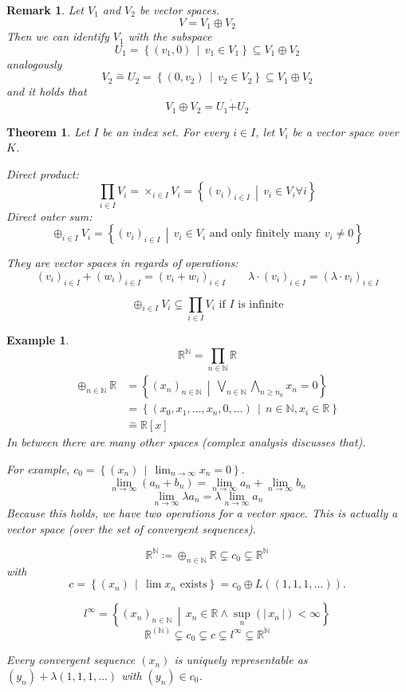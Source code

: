 \documentclass[a4paper,landscape,twocolumn]{article}
\newcommand\abs[1]{|\,#1\,|}
\newcommand\setdef[2]{\left\{#1\,\middle|\,#2\right\}}
\newtheorem{theorem}{Theorem}
\newtheorem{ex}{Example}
\newtheorem{rem}{Remark}
\begin{document}
\begin{rem}
  Let $V_1$ and $V_2$ be vector spaces.
  \[ V = V_1 \oplus V_2 \]
  Then we can identify $V_1$ with the subspace
  \[ U_1 = \setdef{(v_1, 0)}{v_1 \in V_1} \subseteq V_1 \oplus V_2 \]
  analogously
  \[ V_2 \stackrel\sim{=} U_2 = \setdef{(0, v_2)}{v_2 \in V_2} \subseteq V_1 \oplus V_2 \]
  and it holds that
  \[ V_1 \oplus V_2 = U_1 \dot{+} U_2 \]
\end{rem}

\begin{theorem}
  Let $I$ be an index set.
  For every $i \in I$, let $V_i$ be a vector space over $K$.

  Direct product:
  \[ \prod_{i \in I} V_i = \times_{i \in I} V_i = \setdef{(v_i)_{i \in I}}{v_i \in V_i \forall i} \]
  Direct outer sum:
  \[ \oplus_{i \in I} V_i = \setdef{(v_i)_{i \in I}}{v_i \in V_i \text{ and only finitely many } v_i \neq 0} \]

  They are vector spaces in regards of operations:
  \[ (v_i)_{i \in I} + (w_i)_{i \in I} = (v_i + w_i)_{i \in I} \qquad \lambda \cdot (v_i)_{i \in I} = (\lambda \cdot v_i)_{i \in I} \]

  \[ \oplus_{i \in I} V_i \subsetneq \prod_{i \in I} V_i \text{ if $I$ is infinite} \]
\end{theorem}

\begin{ex}
  \[ \mathbb R^{\mathbb N} = \prod_{n \in \mathbb N} \mathbb R \]
  \begin{align*}
    \oplus_{n \in \mathbb N} \mathbb R
      &= \setdef{(x_n)_{n \in \mathbb N}}{\bigvee_{n \in \mathbb N} \bigwedge_{n \geq n_0} x_n = 0} \\
      &= \setdef{(x_0, x_1, \dots, x_n, 0, \dots)}{n \in \mathbb N, x_i \in \mathbb R} \\
      &\stackrel{\sim}= \mathbb R[x]
  \end{align*}
  In between there are \emph{many} other spaces (complex analysis discusses that).

  For example, $c_0 = \setdef{(x_n)}{\lim_{n \to \infty} x_n = 0}$.
  \[ \lim_{n \to \infty} (a_n + b_n) = \lim_{n\to\infty} a_n + \lim_{n\to\infty} b_n \]
  \[ \lim_{n \to \infty} \lambda a_n = \lambda \lim_{n\to\infty} a_n \]
  Because this holds, we have two operations for a vector space. This is actually a vector space (over the set of convergent sequences).

  \[ \mathbb R^{\mathbb N} \coloneqq \oplus_{n \in \mathbb N} \mathbb R \subsetneq c_0 \subsetneq \mathbb R^{\mathbb N} \]
  with
  \[ c = \setdef{(x_n)}{\lim x_n \text{ exists}} = c_0 \oplus L((1, 1, 1, \dots)). \]

  \[ l^\infty = \setdef{(x_n)_{n \in \mathbb N}}{x_n \in \mathbb R \land \sup_n(\abs{x_n}) < \infty} \]
  \[ \mathbb R^{(\mathbb N)} \subsetneq c_0 \subsetneq c \subsetneq l^\infty \subsetneq \mathbb R^{\mathbb N} \]

  Every convergent sequence $(x_n)$ is uniquely representable as $(y_n) + \lambda(1, 1, 1, \dots)$ with $(y_n) \in c_0$.
\end{ex}
\end{document}
